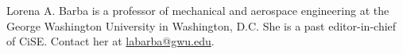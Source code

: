 \begin{IEEEbiography}{Lorena A. Barba} is a professor of mechanical and aerospace engineering at the George Washington University in Washington, D.C. She is a past editor-in-chief of CiSE. Contact her at \href{mailto:labarba@gwu.edu}{labarba@gwu.edu}.
\end{IEEEbiography}
